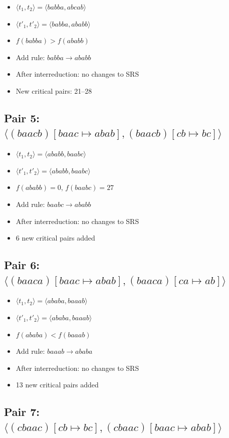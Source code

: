 \documentclass{article}
\begin{document}
\begin{itemize}
\item $\langle t_1, t_2 \rangle = \langle babba, abcab \rangle$
\item $\langle t'_1, t'_2 \rangle = \langle babba, ababb \rangle$
\item $f(babba) > f(ababb)$
\item Add rule: $babba \to ababb$
\item After interreduction: no changes to SRS
\item New critical pairs: 21--28
\end{itemize}

\subsection{Pair 5: $\langle (baacb)[baac \mapsto abab], (baacb)[cb \mapsto bc] \rangle$}

\begin{itemize}
\item $\langle t_1, t_2 \rangle = \langle ababb, baabc \rangle$
\item $\langle t'_1, t'_2 \rangle = \langle ababb, baabc \rangle$
\item $f(ababb) = 0$, $f(baabc) = 27$
\item Add rule: $baabc \to ababb$
\item After interreduction: no changes to SRS
\item 6 new critical pairs added
\end{itemize}

\subsection{Pair 6: $\langle (baaca)[baac \mapsto abab], (baaca)[ca \mapsto ab] \rangle$}

\begin{itemize}
\item $\langle t_1, t_2 \rangle = \langle ababa, baaab \rangle$
\item $\langle t'_1, t'_2 \rangle = \langle ababa, baaab \rangle$
\item $f(ababa) < f(baaab)$
\item Add rule: $baaab \to ababa$
\item After interreduction: no changes to SRS
\item 13 new critical pairs added
\end{itemize}

\subsection{Pair 7: $\langle (cbaac)[cb \mapsto bc], (cbaac)[baac \mapsto abab] \rangle$}
\end{document}
